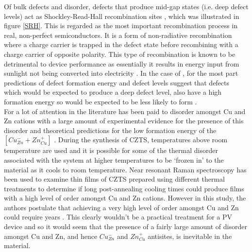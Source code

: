 Of bulk defects and disorder, defects that produce mid-gap states (i.e. deep defect levels) act as Shockley-Read-Hall recombination sites \cite{SRH}, which was illustrated in figure \ref{SRH}. This is regarded as the most important recombination process in real, non-perfect semiconductors. It is a form of non-radiative recombination where a charge carrier is trapped in the defect state before recombining with a charge carrier of opposite polarity. This type of recombination is known to be detrimental to device performance as essentially  it results in energy input from sunlight not being converted into electricity \cite{Nelson4}.
In the case of {\CZTS}, for the most part predictions of defect formation energy and defect levels suggest that defects which would be expected to produce a deep defect level, also have a high formation energy so would be expected to be less likely to form \cite{defect1}.\\

For {\CZTS} a lot of attention in the literature has been paid to disorder amongst Cu and Zn cations with a large amount of experimental evidence for the presence of this disorder \cite{Schorr, CZTS_Xray, CZTS_TEM} and theoretical predictions for the low formation energy of the  $[Cu_{Zn}^{-} + Zn_{Cu}^{+}]$ \cite{defect1}.
During the synthesis of CZTS, temperatures above room temperature are used and it is possible for some of the thermal disorder associated with the system at higher temperatures to be `frozen in' to the material as it cools to room temperature.
Near resonant Raman spectroscopy has been used to examine thin films of CZTS prepared using different thermal treatments to determine if long post-annealing cooling times could produce films with a high level of order amongst Cu and Zn cations. However in this study, the authors postulate that achieving a very high level of order amongst Cu and Zn could require years \cite{Katharina}. This clearly wouldn't be a practical treatment for a PV device and so it would seem that the presence of a fairly large amount of disorder amongst Cu and Zn, and hence $Cu_{Zn}^{-}$ and $Zn_{Cu}^{+}$ antisites,  is inevitable in the material.\\

